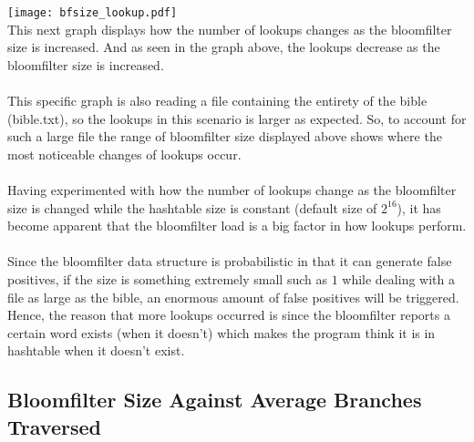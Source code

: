 \documentclass[
	12pt, %
]{fphw}
\begin{document}
\texttt{[image: bfsize\_lookup.pdf]}
\\
This next graph displays how the number of lookups changes as the bloomfilter size is increased. And as seen in the graph above, the lookups decrease as the bloomfilter size is increased. \\
\\
This specific graph is also reading a file containing the entirety of the bible (bible.txt), so the lookups in this scenario is larger as expected. So, to account for such a large file the range of bloomfilter size displayed above shows where the most noticeable changes of lookups occur. \\
\\
Having experimented with how the number of lookups change as the bloomfilter size is changed while the hashtable size is constant (default size of $2^{16}$), it has become apparent that the bloomfilter load is a big factor in how lookups perform. \\
\\
Since the bloomfilter data structure is probabilistic in that it can generate false positives, if the size is something extremely small such as $1$ while dealing with a file as large as the bible, an enormous amount of false positives will be triggered. Hence, the reason that more lookups occurred is since the bloomfilter reports a certain word exists (when it doesn't) which makes the program think it is in hashtable when it doesn't exist.

\subsection{Bloomfilter Size Against Average Branches Traversed}
\end{document}
